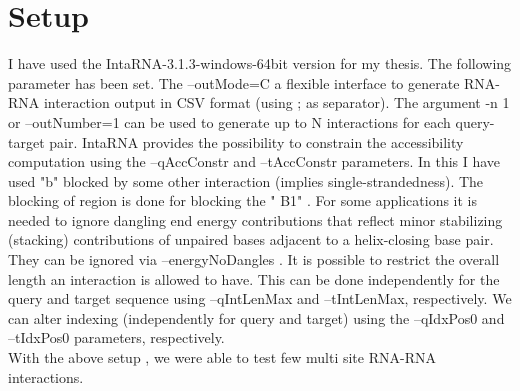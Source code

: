 \documentclass[twoside,a4paper]{report}
\begin{document}
	
	\section{Setup}
	
	I have used the IntaRNA-3.1.3-windows-64bit version for my thesis. The following parameter has been set. The --outMode=C a flexible interface to generate RNA-RNA interaction output in CSV format (using ; as separator). The argument -n 1 or --outNumber=1 can be used to generate up to N interactions for each query-target pair. IntaRNA provides the possibility to constrain the accessibility computation using the --qAccConstr and --tAccConstr parameters. In this I have used "b" blocked by some other interaction (implies single-strandedness). The blocking of region is done for blocking the " B1" . For some applications it is needed to ignore dangling end energy contributions that reflect minor stabilizing (stacking) contributions of unpaired bases adjacent to a helix-closing base pair. They can be ignored via --energyNoDangles . It is possible to restrict the overall length an interaction is allowed to have. This can be done independently for the query and target sequence using --qIntLenMax and --tIntLenMax, respectively. We can alter indexing (independently for query and target) using the --qIdxPos0 and --tIdxPos0 parameters, respectively.\\
	
	
	With the above setup , we were able to test few multi site RNA-RNA interactions.\\
	
%	
	
		
		
\end{document}

